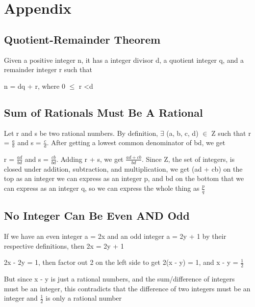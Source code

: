 \documentclass{article}
\begin{document}
\section{Appendix}
\subsection{Quotient-Remainder Theorem}
Given a positive integer n, it has a integer divisor d, a quotient integer q, and a remainder integer r such that \par\noindent n = dq + r, where 0 $\leq$ r \textless d
\subsection{Sum of Rationals Must Be A Rational}
Let r and s be two rational numbers.  By definition, $\exists$ (a, b, c, d) $\in$ Z such that r = $\frac{a}{b}$ and s = $\frac{c}{d}$.  After getting a lowest common denominator of bd, we get \par\noindent r = $\frac{ad}{bd}$ and s = $\frac{cb}{bd}$.  Adding r + s, we get $\frac{ad + cb}{bd}$.  
Since Z, the set of integers, is closed under addition, subtraction, and multiplication, we get (ad + cb) on the top as an integer we can express as an integer p, and bd on the bottom that we can express as an integer q, so we can express the whole thing as $\frac{p}{q}$
\subsection{No Integer Can Be Even AND Odd}
If we have an even integer a = 2x and an odd integer a = 2y + 1 by their respective definitions, then 2x = 2y + 1
\par\noindent 2x - 2y = 1, then factor out 2 on the left side to get 2(x - y) = 1, and x - y = $\frac{1}{2}$
\par\noindent But since x - y is just a rational numbers, and the sum/difference of integers must be an integer, this contradicts that the difference of two integers must be an integer and $\frac{1}{2}$ is only a rational number
\end{document}
